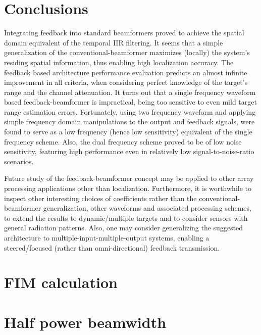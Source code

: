 \documentclass[journal]{IEEEtran}
\begin{document}
\section{Conclusions}
\label{sec_conclusions}
Integrating feedback into standard beamformers proved to achieve the spatial domain equivalent of the temporal IIR filtering.
It seems that a simple generalization of the conventional-beamformer maximizes (locally) the system's residing spatial information, thus enabling high localization accuracy.
The feedback based architecture performance evaluation predicts an almost infinite improvement in all criteria, when considering perfect knowledge of the target's range and the channel attenuation.
It turns out that a single frequency waveform based feedback-beamformer is impractical, being too sensitive to even mild target range estimation errors.
Fortunately, using two frequency waveform and applying simple frequency domain manipulations to the output and feedback signals, were found to serve as a low frequency (hence low sensitivity) equivalent of the single frequency scheme.
Also, the dual frequency scheme proved to be of low noise sensitivity, featuring high performance even in relatively low signal-to-noise-ratio scenarios.
\par Future study of the feedback-beamformer concept may be applied to other array processing applications other than localization.
Furthermore, it is worthwhile to inspect other interesting choices of coefficients rather than the conventional-beamformer generalization, other waveforms and associated processing schemes, to extend the results to dynamic/multiple targets and to consider sensors with general radiation patterns.
Also, one may consider generalizing the suggested architecture to multiple-input-multiple-output systems, enabling a steered/focused (rather than omni-directional) feedback transmission.
\appendices
\section{FIM calculation}
\label{apdx_clacFim}

\section{Half power beamwidth}
\label{apdx_HPBW}

\end{document}
